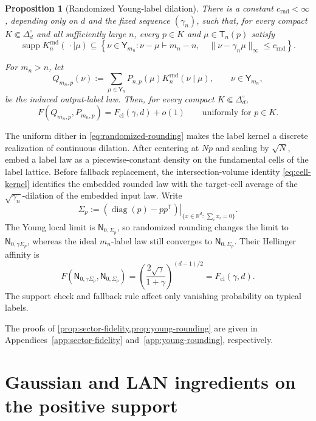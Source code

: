 \documentclass[11pt]{article}
\newtheorem{proposition}[proposition]{Proposition}
\theoremstyle{remark}
\theoremstyle{plain}
\newcommand{\R}{\mathbb R}
\newcommand{\diag}{\operatorname{diag}}
\newcommand{\Fcl}{F_{\mathrm{cl}}}
\begin{document}
\begin{proposition}[Randomized Young-label dilation]
\label{prop:young-rounding}
There is a constant \(c_{\mathrm{rnd}}<\infty\), depending only on \(d\) and
the fixed sequence \((\gamma_n)\), such that, for every compact
\(K\Subset\Delta_d^\circ\) and all sufficiently large \(n\), every
\(p\in K\) and \(\mu\in\mathsf T_n(p)\) satisfy
\[
  \operatorname{supp}K_n^{\mathrm{rnd}}(\,\cdot\mid\mu)
  \subseteq
  \left\{\nu\in\mathsf Y_{m_n}:
    \nu-\mu\vdash m_n-n,\quad
    \|\nu-\gamma_n\mu\|_\infty\le c_{\mathrm{rnd}}
  \right\}.
\]

For \(m_n>n\), let
\[
  Q_{m_n,p}(\nu)
  :=\sum_{\mu\in\mathsf Y_n}
    P_{n,p}(\mu)K_n^{\mathrm{rnd}}(\nu\mid\mu),
  \qquad \nu\in\mathsf Y_{m_n},
\]
be the induced output-label law.  Then, for every compact
\(K\Subset\Delta_d^\circ\),
\begin{equation}\label{eq:rounding-label-fidelity}
  F(Q_{m_n,p},P_{m_n,p})
  =\Fcl(\gamma,d)+o(1)
  \qquad\text{uniformly for }p\in K.
\end{equation}
\end{proposition}

The uniform dither in \eqref{eq:randomized-rounding} makes the label kernel a
discrete realization of continuous dilation.  After centering at \(Np\) and
scaling by \(\sqrt N\), embed a label law as a piecewise-constant density on
the fundamental cells of the label lattice.  Before fallback replacement,
the intersection-volume identity \eqref{eq:cell-kernel} identifies the
embedded rounded law with the target-cell average of the
\(\sqrt{\gamma_n}\)-dilation of the embedded input law.  Write
\[
  \Sigma_p
  :=\left.(\diag(p)-pp^{\mathsf T})\right|_{
    \{x\in\R^d:\,\sum_i x_i=0\}}.
\]
The Young local limit is \(\mathsf N_{0,\Sigma_p}\), so randomized rounding changes the limit
to \(\mathsf N_{0,\gamma\Sigma_p}\), whereas the ideal \(m_n\)-label law
still converges to \(\mathsf N_{0,\Sigma_p}\).  Their Hellinger affinity is
\[
  F\!\left(\mathsf N_{0,\gamma\Sigma_p},
           \mathsf N_{0,\Sigma_p}\right)
  =\left(\frac{2\sqrt\gamma}{1+\gamma}\right)^{(d-1)/2}
  =\Fcl(\gamma,d).
\]
The support check and fallback rule affect only vanishing probability on
typical labels.

The proofs of \cref{prop:sector-fidelity,prop:young-rounding} are given in
Appendices~\ref{app:sector-fidelity} and~\ref{app:young-rounding},
respectively.

\section{Gaussian and LAN ingredients on the positive support}
\label{sec:gaussian-LAN}
\end{document}
